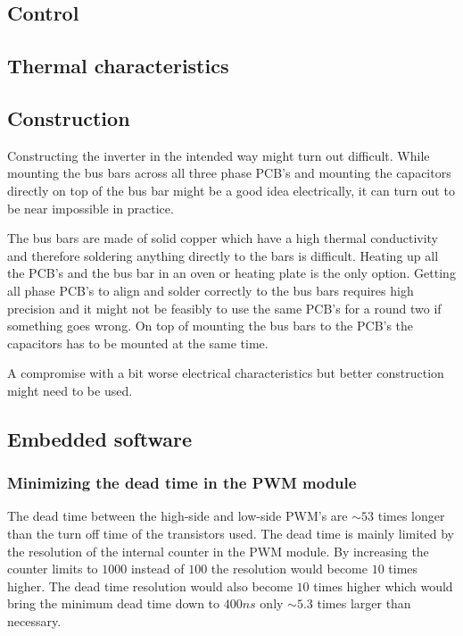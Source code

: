 \subsection{Control}

\subsection{Thermal characteristics}


\subsection{Construction}
Constructing the inverter in the intended way might turn out difficult. While mounting the bus bars across all three phase PCB's and mounting the capacitors directly on top of the bus bar might be a good idea electrically, it can turn out to be near impossible in practice.

The bus bars are made of solid copper which have a high thermal conductivity and therefore soldering anything directly to the bars is difficult. Heating up all the PCB's and the bus bar in an oven or heating plate is the only option. 
Getting all phase PCB's to align and solder correctly to the bus bars requires high precision and it might not be feasibly to use the same PCB's for a round two if something goes wrong.
On top of mounting the bus bars to the PCB's the capacitors has to be mounted at the same time. 

A compromise with a bit worse electrical characteristics but better construction might need to be used.

\subsection{Embedded software}

\subsubsection{Minimizing the dead time in the PWM module}

The dead time between the high-side and low-side PWM's are $\sim 53$ times longer than the turn off time of the transistors used. The dead time is mainly limited by the resolution of the internal counter in the PWM module. By increasing the counter limits to $1000$ instead of $100$ the resolution would become $10$ times higher. The dead time resolution would also become $10$ times higher which would bring the minimum dead time down to $400ns$ only $\sim 5.3$ times larger than necessary.


